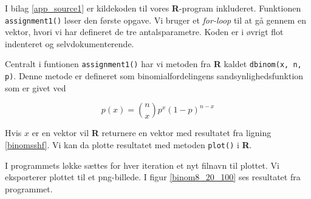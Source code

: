 {
I bilag \ref{app_source1} er kildekoden til vores \textbf{R}-program inkluderet.
Funktionen \texttt{assignment1()} løser den første opgave. Vi bruger et
\emph{for-loop} til at gå gennem en vektor, hvori vi har defineret de tre
antalsparametre. Koden er i øvrigt flot indenteret og selvdokumenterende.

Centralt i funtionen \texttt{assignment1()} har vi metoden fra
\textbf{R} kaldet \texttt{dbinom(x, n, p)}. Denne metode er defineret som
binomialfordelingens sandsynlighedsfunktion som er givet ved

\begin{equation}
    p(x) = \binom{n}{x}p^{x}(1 - p)^{n - x}
    \label{binomsshf}
\end{equation}

Hvis $x$ er en vektor vil \textbf{R} returnere en vektor med resultatet
fra ligning \ref{binomsshf}. Vi kan da plotte resultatet med metoden
\texttt{plot()} i \textbf{R}.

I programmets løkke sættes for hver iteration et nyt filnavn til plottet.
Vi eksporterer plottet til et png-billede. I figur \ref{binom8_20_100}
ses resultatet fra programmet.

}
